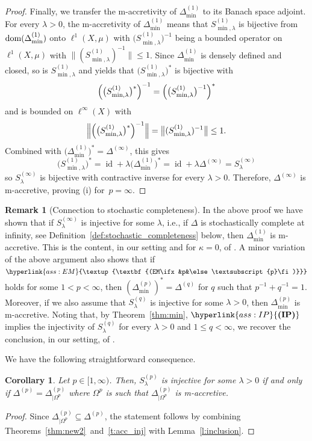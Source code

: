 \documentclass[letterpaper]{article}
\newtheorem{corollary}[lemma]{Corollary}
\theoremstyle{definition}
\newtheorem{remark}[lemma]{Remark}
\theoremstyle{named}
\numberwithin{equation}{section}
\newcommand{\IP}{\hyperlink{ass:IP}{\textup{\textbf{(IP)}}}}
\newcommand{\EM}[1][]{\hyperlink{ass:EM}{\textup{\textbf{(EM\ifx&#1&\else\textsubscript{#1}\fi)}}}}
\newcommand{\dom}{\textnormal{dom}} %
\newcommand{\id}{\operatorname{id}}
\newcommand{\Dep}{\Delta^{(p)}}
\begin{document}
\begin{proof}
Finally, we transfer the m-accretivity of $\Delta_{\min}^{(1)}$ to its Banach space adjoint. 
For every $\lambda>0$, the m-accretivity of $\Delta_{\min}^{(1)}$ means that $S^{(1)}_{\min, \lambda}$ is bijective from $\dom(\Delta_{\min}^{(1)})$ onto $\ell^1(X,\mu)$ with $\bigl(S^{(1)}_{\min, \lambda}\bigr)^{-1}$ being a bounded operator on $\ell^1(X,\mu)$ 
with $\bigl\|(S^{(1)}_{\min, \lambda})^{-1}\bigr\|\le 1$. 
Since $\Delta_{\min}^{(1)}$ is densely defined and closed, so is $S^{(1)}_{\min, \lambda}$ 
and \cite[Proposition~B.11]{EngelNagel2000} yields 
that $\bigl(S^{(1)}_{\min, \lambda}\bigr)^{\ast}$ is bijective with
\[
\Bigl(\bigl(S^{(1)}_{\min, \lambda}\bigr)^{\ast}\Bigr)^{-1}
=\Bigl(\bigl(S^{(1)}_{\min, \lambda}\bigr)^{-1}\Bigr)^{\ast}\]
and is bounded on $\ell^\infty(X)$ with 
\[ \Bigl\|\Bigl(\bigl(S^{(1)}_{\min, \lambda}\bigr)^{\ast}\Bigr)^{-1}\Bigr\|
=\bigl\|(S^{(1)}_{\min, \lambda})^{-1}\bigr\| \le 1.
\]
Combined with $\bigl(\Delta_{\min}^{(1)}\bigr)^{\ast}=\Delta^{(\infty)}$, this gives
\[
\bigl(S^{(1)}_{\min, \lambda}\bigr)^{\ast}
=\id+\lambda\bigl(\Delta_{\min}^{(1)}\bigr)^{\ast}
=\id+\lambda\Delta^{(\infty)}
=S^{(\infty)}_\lambda
\]
so $S^{(\infty)}_\lambda$ is bijective with contractive inverse for every $\lambda>0$. Therefore, 
$\Delta^{(\infty)}$ is m-accretive, proving (i) for~$p=\infty$.
\end{proof}

\begin{remark}[Connection to stochastic completeness]
In the above proof we have shown that if $S^{(\infty)}_\lambda$ is injective for some $\lambda$, i.e., if $\Delta$ is stochastically complete at infinity, see Definition~\ref{def:stochastic_completeness} below, then $\Delta^{(1)}_{\min}$ is m-accretive. This is the content, in our setting and for $\kappa=0$, of  \cite[Theorem 2.11 (ii)] {milatovic2015maximal}.
A minor variation of the above argument also shows that if $\EM[p]$ holds  for some  $1<p<\infty$, then $(\Delta_{\min}^{(p)})^\ast= \Delta^{(q)}$ for $q$ such that $p^{-1}+q^{-1}=1$.  Moreover, if we  also assume that $S^{(q)}_\lambda$ is injective for some $\lambda >0$, then $\Delta^{(p)}_{\min}$ is m-accretive. Noting that, by  Theorem~\ref{thm:min}, $\IP$ implies the  injectivity of $S^{(q)}_\lambda$ for every  $\lambda >0$ and  $1\leq q<\infty$, we recover the conclusion, in our setting,  of  \cite[Theorem 2.11 (i)] {milatovic2015maximal}.
\end{remark}

We  have the following straightforward consequence.
\begin{corollary}
   Let $p\in[1,\infty)$.  Then, $S^{(p)}_\lambda$ is injective for some $\lambda>0$
   if and only if $\Delta^{(p)} = \Delta^{(p)}_{|\Omega^p}$ where $\Omega^p$ is such that $\Delta^{(p)}_{|\Omega^p}$ is m-accretive.
\end{corollary}
\begin{proof}
    Since $\Delta^{(p)}_{\vert \Omega^p} \subseteq \Dep$, the statement follows by combining Theorems~\ref{thm:new2}~and~\ref{t:acc_inj} with Lemma~\ref{l:inclusion}.
\end{proof}
\end{document}
